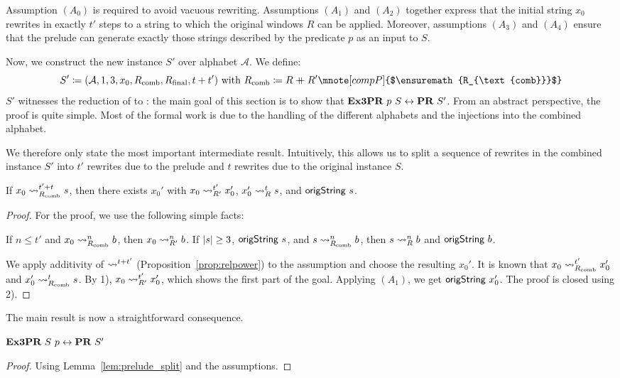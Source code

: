 Assumption $(A_0)$ is required to avoid vacuous rewriting.
Assumptions $(A_1)$ and $(A_2)$ together express that the initial string $x_0$ rewrites in exactly $t'$ steps to a string to which the original windows $R$ can be applied. Moreover, assumptions $(A_3)$ and $(A_4)$ ensure that the prelude can generate exactly those strings described by the predicate $p$ as an input to $S$.

\newcommand{\Rcomb}{\ensuremath{R_{\text{comb}}}}
Now, we construct the new \PR{} instance $S'$ over alphabet $\mathcal{A}$. We define:
\[S' \defeq (\mathcal{A}, 1, 3, x_0, \Rcomb, \Rfinal, t + t')~\text{with}~\Rcomb \defeq R \concat R' \mnote[compP]{$\Rcomb$}\]
$S'$ witnesses the reduction of \expr{} to \PR{}: the main goal of this section is to show that 
$\textbf{Ex3PR}{}~p~S \leftrightarrow \normalfont\textbf{PR}{}~S'$. From an abstract perspective, the proof is quite simple. 
Most of the formal work is due to the handling of the different alphabets and the injections into the combined alphabet.

We therefore only state the most important intermediate result. Intuitively, this allows us to split a sequence of rewrites in the combined instance $S'$ into $t'$ rewrites due to the prelude and $t$ rewrites due to the original instance $S$. 
\begin{lemma}\label{lem:prelude_split}
  If $x_0 \strent{\Rcomb}^{t' + t} s$, then there exists $x_0'$ with $x_0 \rightsquigarrow_{R'}^{t'} x_0'$, $x_0' \rightsquigarrow_{R}^t s$, and $\textsf{origString}~s$. 
\end{lemma}
\begin{proof}
  For the proof, we use the following simple facts:
  \begin{enumerate}[1)]
     If $n \le t'$ and $x_0 \strent{\Rcomb}^n b$, then $x_0 \rightsquigarrow_{R'}^n b$. 
     If $|s| \ge 3$, $\textsf{origString}~s$, and $s \strent{\Rcomb}^n b$, then $s \rightsquigarrow_{R}^n b$ and $\textsf{origString}~b$. 
  \end{enumerate}
  We apply additivity of $\rightsquigarrow_{}^{t+t'}$ (Proposition~\ref{prop:relpower}) to the assumption and choose the resulting $x_0'$. 
  It is known that $x_0 \strent{\Rcomb}^{t'} x_0'$ and $x_0' \strent{\Rcomb}^t s$. 
  By 1), $x_0 \rightsquigarrow_{R'}^{t'} x_0'$, which shows the first part of the goal. 
  Applying $(A_1)$, we get $\textsf{origString}~x_0'$. The proof is closed using 2).
\end{proof}

The main result is now a straightforward consequence.
\begin{theorem}[][prelude_ok]\label{thm:expr_to_pr}
  $\textbf{Ex3PR}{}~S~p \leftrightarrow \normalfont\textbf{PR}{}~S'$
\end{theorem}
\begin{proof}
  Using Lemma~\ref{lem:prelude_split} and the assumptions.
\end{proof}

